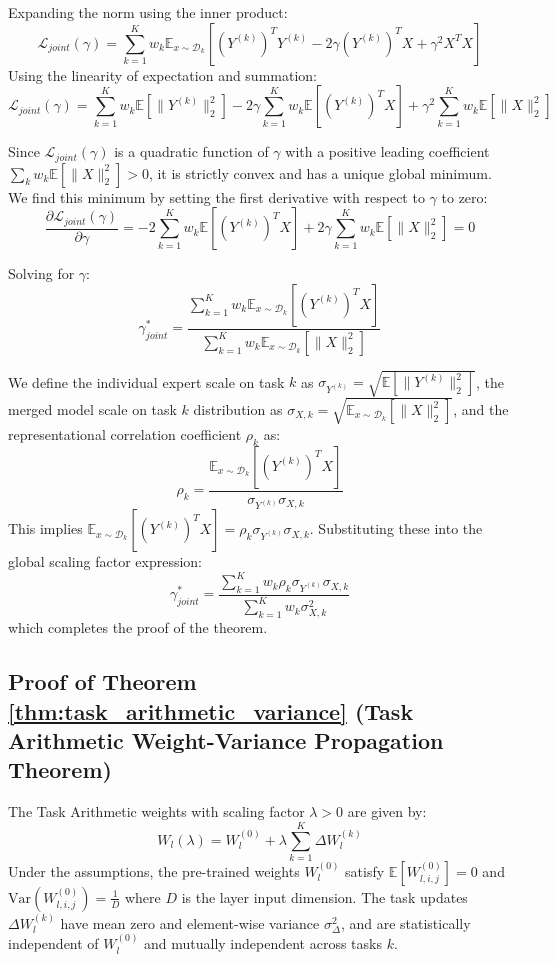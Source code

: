 \documentclass{article}
\theoremstyle{plain}
\theoremstyle{definition}
\theoremstyle{remark}
\begin{document}
Expanding the norm using the inner product:
$$\mathcal{L}_{joint}(\gamma) = \sum_{k=1}^K w_k \mathbb{E}_{x \sim \mathcal{D}_k} \left[ (Y^{(k)})^T Y^{(k)} - 2\gamma (Y^{(k)})^T X + \gamma^2 X^T X \right]$$
Using the linearity of expectation and summation:
$$\mathcal{L}_{joint}(\gamma) = \sum_{k=1}^K w_k \mathbb{E}[\|Y^{(k)}\|_2^2] - 2\gamma \sum_{k=1}^K w_k \mathbb{E}[(Y^{(k)})^T X] + \gamma^2 \sum_{k=1}^K w_k \mathbb{E}[\|X\|_2^2]$$

Since $\mathcal{L}_{joint}(\gamma)$ is a quadratic function of $\gamma$ with a positive leading coefficient $\sum_k w_k \mathbb{E}[\|X\|_2^2] > 0$, it is strictly convex and has a unique global minimum. We find this minimum by setting the first derivative with respect to $\gamma$ to zero:
$$\frac{\partial \mathcal{L}_{joint}(\gamma)}{\partial \gamma} = -2\sum_{k=1}^K w_k \mathbb{E}[(Y^{(k)})^T X] + 2\gamma \sum_{k=1}^K w_k \mathbb{E}[\|X\|_2^2] = 0$$

Solving for $\gamma$:
$$\gamma_{joint}^* = \frac{\sum_{k=1}^K w_k \mathbb{E}_{x \sim \mathcal{D}_k}[(Y^{(k)})^T X]}{\sum_{k=1}^K w_k \mathbb{E}_{x \sim \mathcal{D}_k}[\|X\|_2^2]}$$

We define the individual expert scale on task $k$ as $\sigma_{Y^{(k)}} = \sqrt{\mathbb{E}[\|Y^{(k)}\|_2^2]}$, the merged model scale on task $k$ distribution as $\sigma_{X, k} = \sqrt{\mathbb{E}_{x \sim \mathcal{D}_k}[\|X\|_2^2]}$, and the representational correlation coefficient $\rho_k$ as:
$$\rho_k = \frac{\mathbb{E}_{x \sim \mathcal{D}_k}[(Y^{(k)})^T X]}{\sigma_{Y^{(k)}} \sigma_{X, k}}$$
This implies $\mathbb{E}_{x \sim \mathcal{D}_k}[(Y^{(k)})^T X] = \rho_k \sigma_{Y^{(k)}} \sigma_{X, k}$. Substituting these into the global scaling factor expression:
$$\gamma_{joint}^* = \frac{\sum_{k=1}^K w_k \rho_k \sigma_{Y^{(k)}} \sigma_{X, k}}{\sum_{k=1}^K w_k \sigma_{X, k}^2}$$
which completes the proof of the theorem.

\subsection{Proof of Theorem \ref{thm:task_arithmetic_variance} (Task Arithmetic Weight-Variance Propagation Theorem)}
The Task Arithmetic weights with scaling factor $\lambda > 0$ are given by:
$$W_l(\lambda) = W_l^{(0)} + \lambda \sum_{k=1}^K \Delta W_l^{(k)}$$
Under the assumptions, the pre-trained weights $W_l^{(0)}$ satisfy $\mathbb{E}[W_{l,i,j}^{(0)}] = 0$ and $\text{Var}(W_{l,i,j}^{(0)}) = \frac{1}{D}$ where $D$ is the layer input dimension. The task updates $\Delta W_l^{(k)}$ have mean zero and element-wise variance $\sigma_{\Delta}^2$, and are statistically independent of $W_l^{(0)}$ and mutually independent across tasks $k$.
\end{document}
